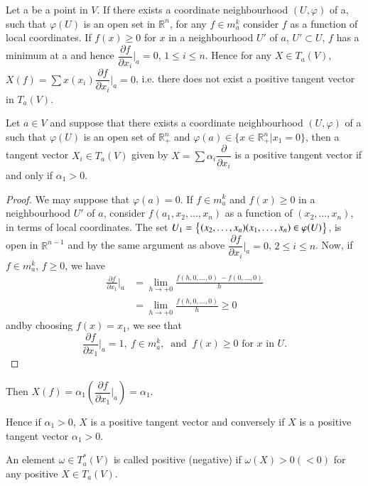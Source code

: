 Let a be a point  in $V$. If there exists a coordinate neighbourhood
$(U, \varphi)$ of a, such that $\varphi (U)$ is an open set in
$\mathbb{R}^n$, for any $f \in m^k_a$ consider  $f$ as a function of
local coordinates. If $f (x) \geq 0$ for $x$ in a neighbourhood $U'$
of $a$, $U' \subset U$, $f$ has a minimum at a and  hence
$\dfrac{\partial f}{\partial x_i} \Big|_a = 0$, $1\leq i \leq
n$. Hence for any $X \in T_a (V)$, $X (f) = \sum x (x_i)
\dfrac{\partial f}{\partial x_i} |_a = 0$, i.e. there does not exist
a positive tangent vector in $T_a (V)$. 

\begin{proposition}\label{chap2:sec5:prop3}  %
  Let $a \in V$ and suppose that there exists a coordinate
  neighbourhood $(U, \varphi )$ of a such that $\varphi (U)$ is an
  open set of $\mathbb{R}^n_+$ and $\varphi (a) \in \big\{ x \in
  \mathbb{R}^n_+ \Big| x_1 = 0 \big \}$, then a tangent vector $X_i
  \in T_a (V)$ given by  $X = \sum \alpha_i  \dfrac{\partial}{\partial
    x_i}$ is a positive tangent vector if and only if $\alpha_1 > 0$.  
\end{proposition}

\begin{proof}
  We may suppose that $\varphi (a) = 0$. If $f \in m^k_a$ and
  $f (x) \geq 0$ in a neighbourhood $U'$ of $a$, consider $f (a_1, x_2,
  \ldots , x_n)$ as a function of $(x_2, \ldots , x_n)$, in terms of
  local coordinates. The set $U_1 = \big\{ (x_2, \ldots , x_n)\break 
  (x_1, \ldots , x_n) \in \varphi (U) \big\}$, is open in
  $\mathbb{R}^{n-1}$ and by the same argument as above
  $\dfrac{\partial f}{\partial x_i} \Big|_a = 0$, $2 \leq i \leq
  n$. Now, if  $f \in m^k_a$, $f \geq 0$, we have  
  \begin{align*}
    \frac{\partial f}{\partial x_1} \Big|_a  &=  \lim\limits_{h \to +
      0}  \frac{f (h, 0, \ldots , 0) ~ - f (0, \ldots ,0)}{h} \\ 
    &= \lim\limits_{h \to + 0}  \frac{f (h, 0, \ldots , 0)}{h} \geq 0
  \end{align*}
  and\pageoriginale by choosing $f (x) = x_1$, we see that 
  $$
  \frac{\partial f}{\partial x_1} \Big|_a = 1,  ~ f \in m^k_a,  ~
  \text{ and } ~ f (x) \geq 0 \text{ for } x  \text{ in } U. 
  $$
\end{proof}

Then \qquad \quad $X (f) = \alpha_1 \left(\dfrac{\partial f}{\partial x_1}
\Big|_a \right)  = \alpha_1$. 

Hence if $\alpha_1 > 0$, $X$ is a positive tangent vector and
conversely if $X$ is a positive tangent vector $\alpha_1 > 0$. 
\begin{defi*}
  An element $\omega \in T^*_a (V)$ is called positive (negative) if
  $\omega (X) > 0 (< 0)$ for any positive $X \in T_a (V)$. 
\end{defi*}


